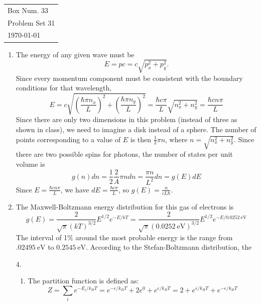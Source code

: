 \documentclass[10pt]{article}
\begin{document}
  \begin{tabular}{l}
    Box Num. 33 \\
    Problem Set 31 \\
    \today
  \end{tabular}

  \begin{enumerate}
    \item The energy of any given wave must be
    \begin{equation*}
        E = pc = c\sqrt{p_x^2 + p_y^2}.
    \end{equation*}
    Since every momentum component must be consistent with the boundary conditions for that wavelength,
    \begin{equation*}
        E = c\sqrt{\left(\frac{\hbar \pi n_x }{L}\right)^2 + \left(\frac{\hbar \pi n_y }{L}\right)^2} =
        \frac{\hbar c \pi}{L}\sqrt{n_x^2 + n_y^2} = \frac{\hbar c n \pi}{L}
    \end{equation*}
    Since there are only two dimensions in this problem (instead of three as shown in class), we need to imagine a disk instead of a sphere. The number of points corresponding to a value of $E$ is then $\frac{1}{2} \pi n$, where $n= \sqrt{n_x^2+n_y^2}$. Since there are two possible spins for photons, the number of states per unit volume is
    \begin{equation*}
        g(n)dn = \frac{1}{2} \frac{2}{A} \pi n dn = \frac{\pi n}{L^2} dn = g(E)dE
    \end{equation*}
    Since $E=\frac{\hbar c n \pi}{L}$, we have $dE = \frac{\hbar c \pi}{L}$, so $g(E) = \frac{n}{cL\hbar}$.

    \item The Maxwell-Boltzmann energy distribution for this gas of electrons is
    \begin{equation*}
        g(E) = \frac{2}{\sqrt{\pi} (kT)^{3/2}}E^{1/2}e^{-E/kT} =
        \frac{2}{\sqrt{\pi} (\SI{0.0252}{\electronvolt})^{3/2}} E^{1/2} e^{-E/\SI{0.0252}{\electronvolt}}
    \end{equation*}
    The interval of 1\% around the most probable energy is the range from $\SI{.02495}{\electronvolt}$ to $\SI{0.2545}{\electronvolt}$. According to the Stefan-Boltzmann distribution, the

  \item[4.] \begin{enumerate}
      \item The partition function is defined as:
      \begin{equation*}
          Z = \sum_{i}e^{-E_i/k_B T} = e^{-\epsilon/k_B T} + 2e^{0} + e^{\epsilon/k_B T} = 2 + e^{\epsilon/k_B T} + e^{-\epsilon/k_B T}
      \end{equation*}


\end{enumerate}
\end{enumerate}
\end{document}
